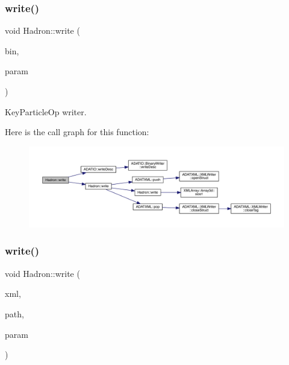 \subsubsection{\texorpdfstring{write()}{write()}\hspace{0.1cm}{\footnotesize\ttfamily [45/95]}}
{\footnotesize\ttfamily void Hadron\+::write (\begin{DoxyParamCaption}\item[{\mbox{\hyperlink{classADATIO_1_1BinaryWriter}{Binary\+Writer}} \&}]{bin,  }\item[{const \mbox{\hyperlink{structHadron_1_1KeyParticleOp__t}{Key\+Particle\+Op\+\_\+t}} \&}]{param }\end{DoxyParamCaption})}



Key\+Particle\+Op writer. 

Here is the call graph for this function\+:
\nopagebreak
\begin{figure}[H]
\begin{center}
\leavevmode
\includegraphics[width=350pt]{d1/daf/namespaceHadron_a4330be9331eb4c839e7e123f5306560b_cgraph}
\end{center}
\end{figure}
\mbox{\label{namespaceHadron_a2737e3c3e39c76c6dbe81ce5e484f6cc}} 
\subsubsection{\texorpdfstring{write()}{write()}\hspace{0.1cm}{\footnotesize\ttfamily [46/95]}}
{\footnotesize\ttfamily void Hadron\+::write (\begin{DoxyParamCaption}\item[{\mbox{\hyperlink{classADATXML_1_1XMLWriter}{X\+M\+L\+Writer}} \&}]{xml,  }\item[{const std\+::string \&}]{path,  }\item[{const \mbox{\hyperlink{structHadron_1_1HadronQuarkLocation__t}{Hadron\+Quark\+Location\+\_\+t}} \&}]{param }\end{DoxyParamCaption})}



